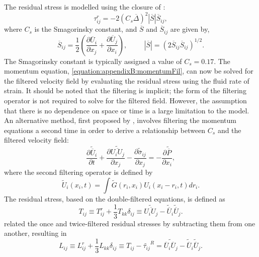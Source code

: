 \documentclass[12pt,oneside,a4paper]{article}
\newcommand{\pdev}[2]{\frac{\partial {#1}}{\partial {#2}}}
\begin{document}
The residual stress is modelled using the closure of \cite{smagorinsky1963}:
\begin{equation}
\label{equation:appendixB:residualStress}
\tau_{ij}^r = - 2 (C_s \overline{\Delta})^2 |\overline{S}| \overline{S}_{ij},
\end{equation}
where $C_s$ is the Smagorinsky constant, and $\overline{S}$ and $\overline{S}_{ij}$ are given by,
\begin{equation}
\overline{S}_{ij} = \frac{1}{2}\left(  \pdev{\overline{U}_i}{x_j} + \pdev{\overline{U}_j}{x_i}  \right), \hspace{1cm} |\overline{S}| = (2 \overline{S}_{ij} \overline{S}_{ij})^{1/2}.
\end{equation}
The Smagorinsky constant is typically assigned a value of $C_s = 0.17$. The momentum equation, \eqref{equation:appendixB:momentumFil}, can now be solved for the filtered velocity field by evaluating the residual stress using the fluid rate of strain. It should be noted that the filtering is implicit; the form of the filtering operator is not required to solve for the filtered field. However, the assumption that there is no dependence on space or time is a large limitation to the model. An alternative method, first proposed by \cite{germano1991}, involves filtering the momentum equations a second time in order to derive a relationship between $C_s$ and the filtered velocity field:
\begin{equation}
\pdev{\widetilde{\overline{U}}_i}{t} + \pdev{\widetilde{\overline{U_i U_j}}}{x_j} - \pdev{\widetilde{\overline{\sigma}}_{ij}}{x_j} = - \pdev{\widetilde{\overline{P}}}{x_i},
\end{equation}
where the second filtering operator is defined by 
\begin{equation}
\widetilde{U}_i(x_i,t) = \int \widetilde{G}(r_i,x_i) U_i(x_i - r_i,t) dr_i.
\end{equation} 
The residual stress, based on the double-filtered equations, is defined as
\begin{equation}
T_{ij} \equiv  T_{ij}^r + \frac{1}{3}T_{kk} \delta_{ij}   \equiv \widetilde{\overline{U_i U_j}} - \widetilde{\overline{U}}_i \widetilde{\overline{U}}_j.
\end{equation}
\cite{germano1991} related the once and twice-filtered residual stresses by subtracting them from one another, resulting in
\begin{equation}
\label{equation:appendixB:germano}
L_{ij} \equiv  L_{ij}^r + \frac{1}{3}L_{kk} \delta_{ij}  \equiv T_{ij} - \widetilde{\tau_{ij}}^R = \widetilde{\overline{U}_i \overline{U}_j} - \widetilde{\overline{U}}_i \widetilde{\overline{U}}_j.
\end{equation}
\end{document}
